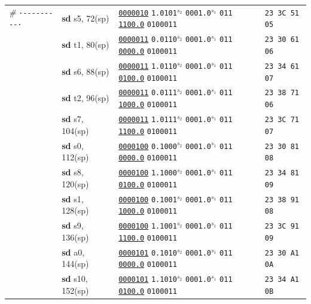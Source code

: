 \documentclass[a4paper,12pt,final]{article}
\begin{document}
\begin{table}[!htbp]
\begin{adjustwidth}{-1cm}{-1cm}
\begin{center}
\begin{tabular}{l|ll|l}
\emph{\#}\hspace{2.106000em} \texttt{·-{}-{}-{}-{}-{}-{}-{}-{}-·} & \textbf{sd} s5,   72(sp) & \uline{\texttt{0000010}} \texttt{1.0101}​\(^{s_{2}}\) \texttt{0001.0}​\(^{s_{1}}\) \texttt{011} \uline{\texttt{1100.0}} \texttt{0100011} & \texttt{23 3C 51 05}\\[0pt]
 & \textbf{sd} t1,   80(sp) & \uline{\texttt{0000011}} \texttt{0.0110}​\(^{s_{2}}\) \texttt{0001.0}​\(^{s_{1}}\) \texttt{011} \uline{\texttt{0000.0}} \texttt{0100011} & \texttt{23 30 61 06}\\[0pt]
 & \textbf{sd} s6,   88(sp) & \uline{\texttt{0000011}} \texttt{1.0110}​\(^{s_{2}}\) \texttt{0001.0}​\(^{s_{1}}\) \texttt{011} \uline{\texttt{0100.0}} \texttt{0100011} & \texttt{23 34 61 07}\\[0pt]
 & \textbf{sd} t2,   96(sp) & \uline{\texttt{0000011}} \texttt{0.0111}​\(^{s_{2}}\) \texttt{0001.0}​\(^{s_{1}}\) \texttt{011} \uline{\texttt{1000.0}} \texttt{0100011} & \texttt{23 38 71 06}\\[0pt]
 & \textbf{sd} s7,  104(sp) & \uline{\texttt{0000011}} \texttt{1.0111}​\(^{s_{2}}\) \texttt{0001.0}​\(^{s_{1}}\) \texttt{011} \uline{\texttt{1100.0}} \texttt{0100011} & \texttt{23 3C 71 07}\\[0pt]
 & \textbf{sd} s0,  112(sp) & \uline{\texttt{0000100}} \texttt{0.1000}​\(^{s_{2}}\) \texttt{0001.0}​\(^{s_{1}}\) \texttt{011} \uline{\texttt{0000.0}} \texttt{0100011} & \texttt{23 30 81 08}\\[0pt]
 & \textbf{sd} s8,  120(sp) & \uline{\texttt{0000100}} \texttt{1.1000}​\(^{s_{2}}\) \texttt{0001.0}​\(^{s_{1}}\) \texttt{011} \uline{\texttt{0100.0}} \texttt{0100011} & \texttt{23 34 81 09}\\[0pt]
 & \textbf{sd} s1,  128(sp) & \uline{\texttt{0000100}} \texttt{0.1001}​\(^{s_{2}}\) \texttt{0001.0}​\(^{s_{1}}\) \texttt{011} \uline{\texttt{1000.0}} \texttt{0100011} & \texttt{23 38 91 08}\\[0pt]
 & \textbf{sd} s9,  136(sp) & \uline{\texttt{0000100}} \texttt{1.1001}​\(^{s_{2}}\) \texttt{0001.0}​\(^{s_{1}}\) \texttt{011} \uline{\texttt{1100.0}} \texttt{0100011} & \texttt{23 3C 91 09}\\[0pt]
 & \textbf{sd} a0,  144(sp) & \uline{\texttt{0000101}} \texttt{0.1010}​\(^{s_{2}}\) \texttt{0001.0}​\(^{s_{1}}\) \texttt{011} \uline{\texttt{0000.0}} \texttt{0100011} & \texttt{23 30 A1 0A}\\[0pt]
 & \textbf{sd} s10, 152(sp) & \uline{\texttt{0000101}} \texttt{1.1010}​\(^{s_{2}}\) \texttt{0001.0}​\(^{s_{1}}\) \texttt{011} \uline{\texttt{0100.0}} \texttt{0100011} & \texttt{23 34 A1 0B}\\[0pt]

\end{tabular}
\end{center}
\end{adjustwidth}
\end{table}
\end{document}

